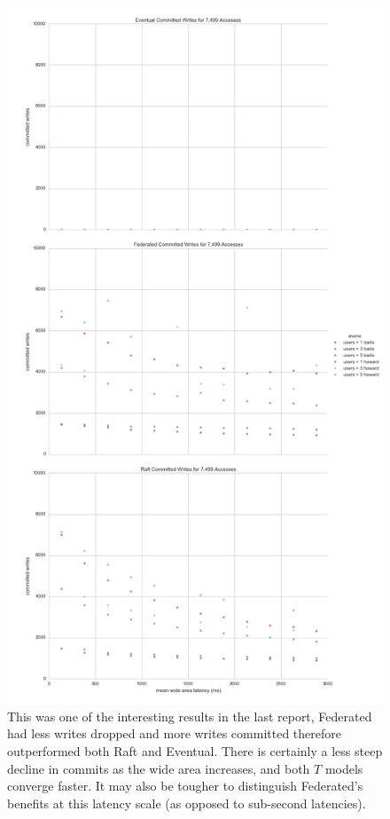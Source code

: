 \documentclass[10pt,letterpaper]{article}
\begin{document}
\begin{figure}[!h]
    \centering
        \includegraphics[height=0.9\textheight]{figures/committed_writes.png}
        \caption{\textsf{This was one of the interesting results in the last report, Federated had less writes dropped and more writes committed therefore outperformed both Raft and Eventual. There is certainly a less steep decline in commits as the wide area increases, and both $T$ models converge faster. It may also be tougher to distinguish Federated's benefits at this latency scale (as opposed to sub-second latencies).}}
        \label{fig:committed_writes}
\end{figure}
\end{document}
